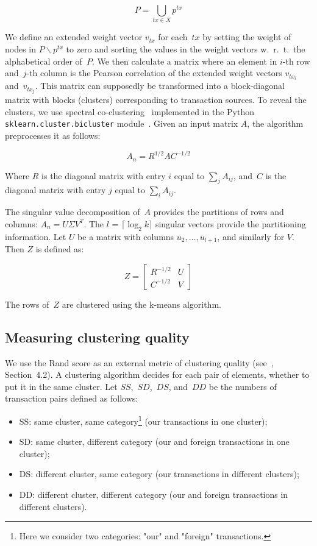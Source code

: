 \[
P = \bigcup\limits_{tx \in X} p^{tx}
\]

We define an extended weight vector $v_{tx}$ for each~$tx$ by setting the weight of nodes in $P \backslash p^{tx}$ to zero and sorting the values in the weight vectors w.~r.~t.~the alphabetical order of~$P$.
We then calculate a matrix where an element in $i$-th row and~$j$-th column is the Pearson correlation of the extended weight vectors $v_{tx_i}$ and~$v_{tx_j}$.
This matrix can supposedly be transformed into a block-diagonal matrix with blocks (clusters) corresponding to transaction sources.
To reveal the clusters, we use spectral co-clustering~\cite{Dhillon2001} implemented in the Python \texttt{sklearn.cluster.bicluster} module~\cite{scikit-learn, scikitlearn2018}.
Given an input matrix $A$, the algorithm preprocesses it as follows:

\[
A_n = R^{1/2}AC^{-1/2}
\]

Where $R$ is the diagonal matrix with entry $i$ equal to $\sum_{j} A_{ij}$, and~$C$ is the diagonal matrix with entry $j$ equal to $\sum_{i} A_{ij}$.

The singular value decomposition of~$A$ provides the partitions of rows and columns: $A_{n}=U \Sigma V^{T}$.
The $l$ = $\lceil \log_2 k \rceil$ singular vectors provide the partitioning information.
Let $U$ be a matrix with columns $u_2,\dots,u_{l+1}$, and similarly for $V$.
Then $Z$ is defined as:

\[
Z = 
\begin{bmatrix}
R^{-1/2} & U \\
C^{-1/2} & V
\end{bmatrix}
\]

The rows of~$Z$ are clustered using the k-means algorithm.


\subsection{Measuring clustering quality}

We use the Rand score as an external metric of clustering quality (see~\cite{Amigo2009}, Section~4.2).
A clustering algorithm decides for each pair of elements, whether to put it in the same cluster.
Let $SS$,~$SD$,~$DS$, and~$DD$ be the numbers of transaction pairs defined as follows:
\begin{itemize}
	\item SS: same cluster, same category\footnote{Here we consider two categories: "our" and "foreign" transactions.} (our transactions in one cluster);
	\item SD: same cluster, different category (our and foreign transactions in one cluster);
	\item DS: different cluster, same category (our transactions in different clusters);
	\item DD: different cluster, different category (our and foreign transactions in different clusters).
\end{itemize}

